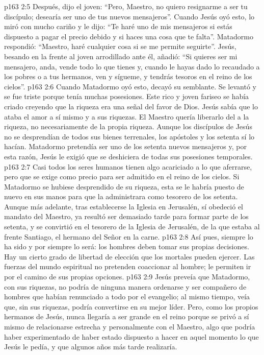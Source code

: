 \vs p163 2:5 Después, dijo el joven: “Pero, Maestro, no quiero resignarme a ser tu discípulo; desearía ser uno de tus nuevos mensajeros”. Cuando Jesús oyó esto, lo miró con mucho cariño y le dijo: “Te haré uno de mis mensajeros si estás dispuesto a pagar el precio debido y si haces una cosa que te falta”. Matadormo respondió: “Maestro, haré cualquier cosa si se me permite seguirte”. Jesús, besando en la frente al joven arrodillado ante él, añadió: “Si quieres ser mi mensajero, anda, vende todo lo que tienes y, cuando le hayas dado lo recaudado a los pobres o a tus hermanos, ven y sígueme, y tendrás tesoros en el reino de los cielos”.
\vs p163 2:6 Cuando Matadormo oyó esto, decayó su semblante. Se levantó y se fue triste porque tenía muchas posesiones. Este rico y joven fariseo se había criado creyendo que la riqueza era una señal del favor de Dios. Jesús sabía que lo ataba el amor a sí mismo y a sus riquezas. El Maestro quería liberarlo del  a la riqueza, no necesariamente de la propia riqueza. Aunque los discípulos de Jesús no se desprendían de todos sus bienes terrenales, los apóstoles y los setenta sí lo hacían. Matadormo pretendía ser uno de los setenta nuevos mensajeros y, por esta razón, Jesús le exigió que se deshiciera de todas sus posesiones temporales.
\vs p163 2:7 \pc Casi todos los seres humanos tienen algo acariciado a lo que aferrarse, pero que se exige como precio para ser admitido en el reino de los cielos. Si Matadormo se hubiese desprendido de su riqueza, esta se le habría puesto de nuevo en sus manos para que la administrara como tesorero de los setenta. Aunque más adelante, tras establecerse la Iglesia en Jerusalén, sí obedeció el mandato del Maestro, ya resultó ser demasiado tarde para formar parte de los setenta, y se convirtió en el tesorero de la Iglesia de Jerusalén, de la que estaba al frente Santiago, el hermano del Señor en la carne.
\vs p163 2:8 Así pues, siempre lo ha sido y por siempre lo será: los hombres deben tomar sus propias decisiones. Hay un cierto grado de libertad de elección que los mortales pueden ejercer. Las fuerzas del mundo espiritual no pretenden coaccionar al hombre; le permiten ir por el camino de sus propias opciones.
\vs p163 2:9 Jesús preveía que Matadormo, con sus riquezas, no podría de ninguna manera ordenarse y ser compañero de hombres que habían renunciado a todo por el evangelio; al mismo tiempo, veía que, sin sus riquezas, podría convertirse en su mejor líder. Pero, como los propios hermanos de Jesús, nunca llegaría a ser grande en el reino porque se privó a sí mismo de relacionarse estrecha y personalmente con el Maestro, algo que podría haber experimentado de haber estado dispuesto a hacer en aquel momento lo que Jesús le pedía, y que algunos años más tarde realizaría.
